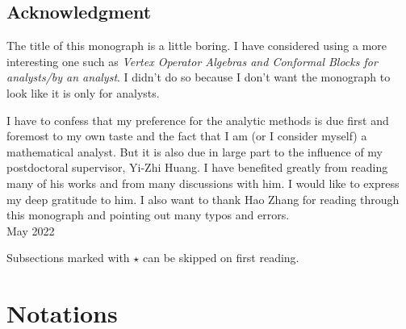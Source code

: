 \documentclass[11pt,b5paper,notitlepage]{article}
\theoremstyle{definition}
\theoremstyle{plain}
\numberwithin{equation}{section}
\begin{document}
\subsection*{Acknowledgment}


The title of this monograph is a little boring. I have considered using a more interesting one such as \emph{Vertex Operator Algebras and Conformal Blocks for analysts/by an analyst}. I didn't do so because I don't want the monograph to look like it is only for analysts. 




I have to confess that my preference for the analytic methods is due first and foremost to my own taste and the fact that I am (or I consider myself) a mathematical analyst. But it is also due in large part to the influence of my postdoctoral supervisor, Yi-Zhi Huang. I have benefited greatly from reading many of his works and from many discussions with him. I would like to express my deep gratitude to him. I also want to thank Hao Zhang for reading through this monograph and pointing out many typos and errors.\\[2ex]

\hfill May 2022









 




 





 












\newpage
	
Subsections marked with $\star$ can be skipped on first reading.

\section{Notations}
\end{document}

